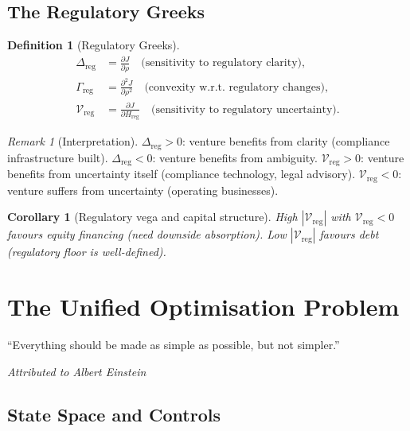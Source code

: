 \documentclass[12pt,a4paper,oneside]{book}
\newtheorem{corollary}[theorem]{Corollary}
\theoremstyle{definition}
\newtheorem{definition}[theorem]{Definition}
\theoremstyle{remark}
\newtheorem{remark}[theorem]{Remark}
\begin{document}
\section{The Regulatory Greeks}\label{sec:reg_greeks}

\begin{definition}[Regulatory Greeks]\label{def:reg_greeks}
\begin{align}
  \Delta_{\text{reg}} &= \frac{\partial J}{\partial \rho}
    \quad \text{(sensitivity to regulatory clarity)}, \\[6pt]
  \Gamma_{\text{reg}} &= \frac{\partial^2 J}{\partial \rho^2}
    \quad \text{(convexity w.r.t.\ regulatory changes)}, \\[6pt]
  \mathcal{V}_{\text{reg}} &= \frac{\partial J}{\partial H_{\text{reg}}}
    \quad \text{(sensitivity to regulatory uncertainty)}.
\end{align}
\end{definition}

\begin{remark}[Interpretation]
$\Delta_{\text{reg}} > 0$: venture benefits from clarity (compliance infrastructure
built). $\Delta_{\text{reg}} < 0$: venture benefits from ambiguity.
$\mathcal{V}_{\text{reg}} > 0$: venture benefits from uncertainty itself (compliance
technology, legal advisory). $\mathcal{V}_{\text{reg}} < 0$: venture suffers from
uncertainty (operating businesses).
\end{remark}

\begin{corollary}[Regulatory vega and capital structure]
High $|\mathcal{V}_{\text{reg}}|$ with $\mathcal{V}_{\text{reg}} < 0$ favours equity
financing (need downside absorption). Low $|\mathcal{V}_{\text{reg}}|$ favours debt
(regulatory floor is well-defined).
\end{corollary}

\chapter{The Unified Optimisation Problem}\label{ch:synthesis}

\epigraph{``Everything should be made as simple as possible, but not simpler.''}
{\textit{Attributed to Albert Einstein}}

\section{State Space and Controls}
\end{document}
